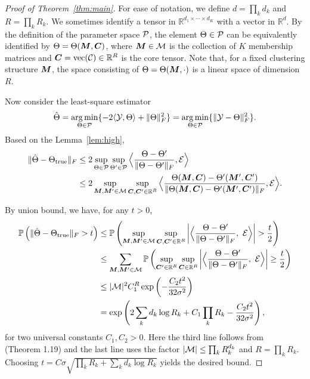 \documentclass{article}
\begin{document}
\begin{appendices}
\begin{proof}[Proof of Theorem~\ref{thm:main}]
For ease of notation, we define $d=\prod_k d_k$ and $R=\prod_k R_k$. We sometimes identify a tensor in $\mathbb{R}^{d_1\times \cdots \times d_K}$ with a vector in $\mathbb{R}^d$. By the definition of the parameter space $\mathcal{P}$, the element $\Theta\in \mathcal{P}$ can be equivalently identified by $\Theta=\Theta(\bm M, \bm C)$, where $\bm M\in \mathcal{M}$ is the collection of $K$ membership matrices and $\bm C=\text{vec}(\mathcal{C})\in\mathbb{R}^R$ is the core tensor. Note that, for a fixed clustering structure $\bm M$, the space consisting of $\Theta=\Theta(\bm M,\cdot)$ is a linear space of dimension $R$. 




Now consider the least-square estimator
\[
\hat \Theta=\operatorname*{arg\,min}_{\Theta\in\mathcal{P}}\{-2\langle \mathcal{Y}, \Theta\rangle+\lVert\Theta\rVert_F^2 \}=\operatorname*{arg\,min}_{\Theta\in\mathcal{P}}\{\lVert\mathcal{Y}-\Theta\rVert_F^2 \}.
\]
Based on the Lemma~\ref{lem:high},
\begin{align}
\lVert\hat \Theta-\Theta_{\text{true}}\rVert_F&\leq 2\sup_{\Theta\in\mathcal{P}} \sup_{\Theta'\in \mathcal{P}} \Big\langle {\Theta-\Theta'\over \lVert\Theta-\Theta'\rVert_F}, \mathcal{E} \Big\rangle\\
&\leq 2\sup_{\bm M, \bm M' \in \mathcal{M}}\sup_{\bm C, \bm C' \in \mathbb{R}^R}\Big\langle {\Theta(\bm M, \bm C)-\Theta'(\bm M', \bm C')\over \lVert\Theta(\bm M, \bm C)-\Theta' (\bm M', \bm C')\rVert_F}, \mathcal{E} \Big\rangle.
\end{align}

By union bound, we have, for any $t>0$,
\begin{align}
\mathbb{P}\left(\FnormSize{}{\hat \Theta-\trueT} > t\right)&\leq \mathbb{P}\left(\sup_{\mM, \mM'\in \tM}\sup_{\mC, \mC'\in \mathbb{R}^R} \left|\Big\langle {\Theta-\Theta'\over \FnormSize{}{\Theta-\Theta'}}, \ \tE\Big\rangle\right|>{t\over 2}\right)\\
&\leq \sum_{\mM, \mM'\in \tM}\mathbb{P}\left(\sup_{\mC'\in \mathbb{R}^R}\sup_{\mC\in \mathbb{R}^R}\left|\Big\langle {\Theta-\Theta'\over \FnormSize{}{\Theta-\Theta'}},\ \tE\Big\rangle \right|\geq {t\over 2}\right)\\
&\leq |\tM|^2C_1^R\exp\left(-{C_2 t^2\over 32\sigma^2}\right)\\
&=\exp\left(2\sum_kd_k\log R_k+C_1\prod_k R_k-{C_2t^2\over 32\sigma^2}\right),
\end{align}
for two universal constants $C_1, C_2>0$. Here the third line follows from~\cite{rigollet2015high} (Theorem 1.19) and the last line uses the factor $|\mathcal{M}|\leq \prod_k R_k^{d_k}$ and $R=\prod_k R_k$. Choosing $t=C\sigma\sqrt{\prod_k R_k+\sum_k d_k\log R_k}$ yields the desired bound. 
\end{proof}


\end{appendices}
\end{document}
